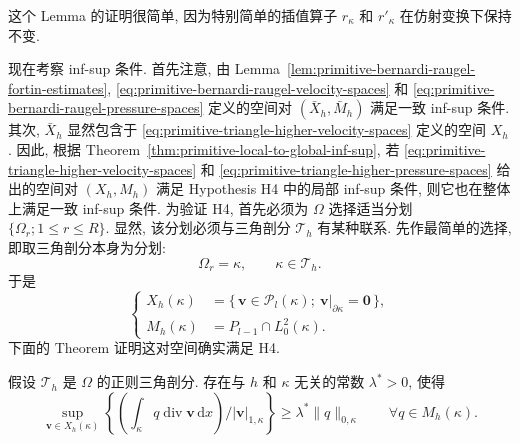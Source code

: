 \setcounter{statement}{2}
\begin{Remark}\label{rem:primitive-triangle-affine-interpolants}
这个 Lemma 的证明很简单, 因为特别简单的插值算子
$r_\kappa$ 和 $r'_\kappa$ 在仿射变换下保持不变.
\end{Remark}

现在考察 inf-sup 条件. 首先注意, 由
Lemma~\ref{lem:primitive-bernardi-raugel-fortin-estimates},
\eqref{eq:primitive-bernardi-raugel-velocity-spaces} 和
\eqref{eq:primitive-bernardi-raugel-pressure-spaces} 定义的空间对
$(\bar X_h,\bar M_h)$ 满足一致 inf-sup 条件. 其次, $\bar X_h$
显然包含于 \eqref{eq:primitive-triangle-higher-velocity-spaces}
定义的空间 $X_h$. 因此, 根据
Theorem~\ref{thm:primitive-local-to-global-inf-sup}, 若
\eqref{eq:primitive-triangle-higher-velocity-spaces} 和
\eqref{eq:primitive-triangle-higher-pressure-spaces} 给出的空间对
$(X_h,M_h)$ 满足 Hypothesis H4 中的局部 inf-sup 条件,
则它也在整体上满足一致 inf-sup 条件. 为验证 H4, 首先必须为
$\Omega$ 选择适当分划 $\{\Omega_r;1\leq r\leq R\}$.
显然, 该分划必须与三角剖分 $\mathcal{T}_h$ 有某种联系.
先作最简单的选择, 即取三角剖分本身为分划:
\[
\Omega_r=\kappa,
\qquad\kappa\in\mathcal{T}_h.
\]
于是
\begin{equation}\label{eq:primitive-triangle-local-inf-sup-spaces}
\left\{
\begin{aligned}
X_h(\kappa)&=\{\,\mathbf v\in\mathcal{P}_l(\kappa);
\ \mathbf v|_{\partial\kappa}=\mathbf0\,\},\\
M_h(\kappa)&=P_{l-1}\cap L_0^2(\kappa).
\end{aligned}
\right.
\end{equation}
下面的 Theorem 证明这对空间确实满足 H4.

\setcounter{statement}{1}
\begin{Theorem}\label{thm:primitive-triangle-local-inf-sup}
假设 $\mathcal{T}_h$ 是 $\Omega$ 的正则三角剖分.
存在与 $h$ 和 $\kappa$ 无关的常数 $\lambda^*>0$, 使得
\begin{equation}\label{eq:primitive-triangle-local-inf-sup}
\sup_{\mathbf v\in X_h(\kappa)}
\left\{
\left(\int_\kappa q\operatorname{div}\mathbf v\,\mathrm dx\right)
/|\mathbf v|_{1,\kappa}
\right\}
\geq\lambda^*\|q\|_{0,\kappa}
\qquad\forall q\in M_h(\kappa).
\end{equation}
\end{Theorem}

